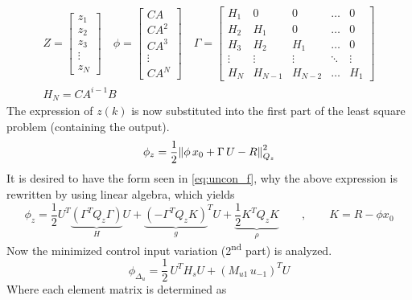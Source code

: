 \begin{equation}
    \begin{gathered}
        Z=\begin{bmatrix}
            z_1\\
            z_2\\
            z_3\\
            \vdots\\
            z_N
        \end{bmatrix} \quad
        \phi=\begin{bmatrix}
            CA\\
            CA^2\\
            CA^3\\
            \vdots\\
            CA^N
        \end{bmatrix} \quad
            \Gamma=\begin{bmatrix}
            H_1 & 0 & 0 & \dots & 0\\
            H_2 & H_1 & 0 & \dots & 0\\
            H_3 & H_2 & H_1 & \dots & 0\\
            \vdots & \vdots & \vdots & \ddots & \vdots\\
            H_N & H_{N-1} & H_{N-2} & \dots & H_1
        \end{bmatrix} \\
        H_N=CA^{i-1}B
    \end{gathered}
    \label{eq:uncon_design}
\end{equation}
The expression of $z(k)$ is now substituted into the first part of the least square problem (containing the output).
\begin{equation}
    \phi_z=\frac{1}{2}\norm{\phi\,x_0+\Gamma\,U-R}_{Q_z}^2
\end{equation}
It is desired to have the form seen in \cref{eq:uncon_f}, why the above expression is rewritten by using linear algebra, which yields
\begin{equation}
    \phi_z=\frac{1}{2}U^T\underbrace{(\Gamma^TQ_z\Gamma)}_HU+{\underbrace{(-\Gamma^TQ_zK)}_{g}}^TU+\underbrace{\frac{1}{2}K^TQ_zK}_\rho\qquad , \qquad K=R-\phi x_0     
\end{equation}
Now the minimized control input variation (2\textsuperscript{nd} part) is analyzed.
\begin{equation}
    \phi_{\Delta_u}=\frac{1}{2}\,U^TH_sU+(M_{u1}\,u_{-1})^TU
\end{equation}
Where each element matrix is determined as
